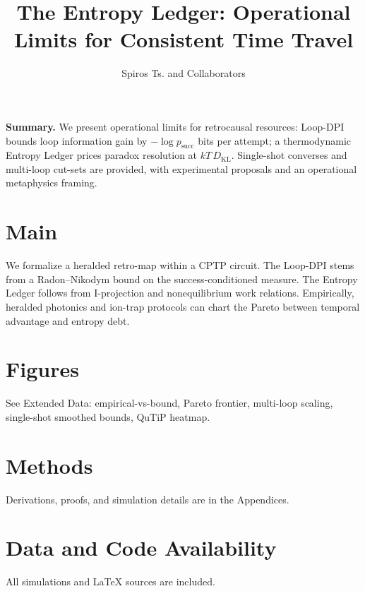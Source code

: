 \documentclass[12pt]{article}
\title{\bf The Entropy Ledger: Operational Limits for Consistent Time Travel}
\author{Spiros Ts. and Collaborators}
\date{}
\newcommand{\Ps}{p_{\mathrm{succ}}}
\begin{document}
\maketitle

\textbf{Summary.} We present operational limits for retrocausal resources: Loop-DPI bounds loop information gain by $-\log \Ps$ bits per attempt; a thermodynamic Entropy Ledger prices paradox resolution at $kT\,D_{\mathrm{KL}}$. Single-shot converses and multi-loop cut-sets are provided, with experimental proposals and an operational metaphysics framing.

\section*{Main}
We formalize a heralded retro-map within a CPTP circuit. The Loop-DPI stems from a Radon--Nikodym bound on the success-conditioned measure. The Entropy Ledger follows from I-projection and nonequilibrium work relations. Empirically, heralded photonics and ion-trap protocols can chart the Pareto between temporal advantage and entropy debt.

\section*{Figures}
See Extended Data: empirical-vs-bound, Pareto frontier, multi-loop scaling, single-shot smoothed bounds, QuTiP heatmap.

\section*{Methods}
Derivations, proofs, and simulation details are in the Appendices.

\section*{Data and Code Availability}
All simulations and \LaTeX{} sources are included.



\end{document}
